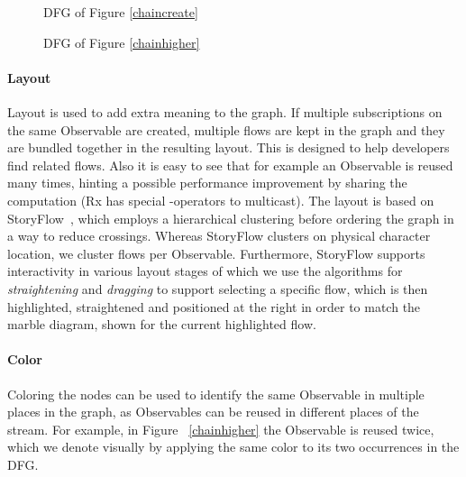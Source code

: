 \begin{figure}[ht]
    \centering
    
    \caption{DFG of Figure%
    \ref{chaincreate}}%
    \label{fiddlesimple}
\end{figure}

\begin{figure}[ht]
    \centering
    
    \caption{DFG of Figure%
    \ref{chainhigher}}%
    \label{fiddlehigher}
\end{figure}

\paragraph{Layout} Layout is used to add extra meaning to the graph.  If
multiple subscriptions on the same Observable are created, multiple
flows are kept in the graph and they are bundled together in the
resulting layout.  This is designed to help developers find related
flows.  Also it is easy to see that for example an Observable is reused
many times, hinting a possible performance improvement by sharing the
computation (Rx has special -operators to multicast).  The
layout is based on StoryFlow~\cite{liu2013storyflow}, which employs a
hierarchical clustering before ordering the graph in a way to reduce
crossings.  Whereas StoryFlow clusters on physical character location,
we cluster flows per Observable.  Furthermore, StoryFlow supports
interactivity in various layout stages of which we use the algorithms
for \emph{straightening} and \emph{dragging} to support selecting a
specific flow, which is then highlighted, straightened and positioned at
the right in order to match the marble diagram, shown for the current
highlighted flow.

\paragraph{Color} Coloring the nodes can be used to identify the same
Observable in multiple places in the graph, as Observables can be reused
in different places of the stream.  For example, in Figure~%
\ref{chainhigher} the  Observable is reused twice, which we
denote visually by applying the same color to its two occurrences in the
DFG.

